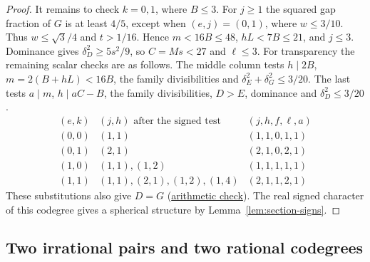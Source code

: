\documentclass[11pt,reqno]{amsart}
\newcommand{\codecheck}[2]{\href{https://github.com/sebastienpalcoux/grothendieck-ring-classification/blob/d5750105bb5758f3ad38d2e5464dfcc12c019816/supplements/rank6/sphericality/#1}{#2}}
\theoremstyle{remark}\newtheorem{remark}[theorem]{Remark}
\numberwithin{equation}{section}
\begin{document}
\begin{proof}
It remains to check $k=0,1$, where $B\le3$.
For $j\ge1$ the squared gap fraction of $G$ is at least $4/5$,
except when $(e,j)=(0,1)$, where $w\le3/10$.
Thus $w\le\sqrt3/4$ and $t>1/16$. Hence $m<16B\le48$,
$hL<7B\le21$, and $j\le3$. Dominance gives
$\delta_D^2\ge5s^2/9$, so $C=Ms<27$ and $\ell\le3$.
For transparency the remaining scalar checks are as follows.
The middle column tests $h\mid2B$, $m=2(B+hL)<16B$,
the family divisibilities and $\delta_E^2+\delta_G^2\le3/20$.
The last tests $a\mid m$, $h\mid aC-B$, the family divisibilities,
$D>E$, dominance and $\delta_D^2\le3/20$.
\[
\begin{array}{c|l|c}
(e,k)&(j,h)\text{ after the signed test}&(j,h,f,\ell,a)\\\hline
(0,0)&(1,1)&(1,1,0,1,1)\\
(0,1)&(2,1)&(2,1,0,2,1)\\
(1,0)&(1,1),(1,2)&(1,1,1,1,1)\\
(1,1)&(1,1),(2,1),(1,2),(1,4)&(2,1,1,2,1)
\end{array}
\]
These substitutions also give $D=G$
(\codecheck{golden_orbit_check.py}{arithmetic check}).
The real signed character of this codegree gives a spherical
structure by Lemma~\ref{lem:section-signs}.
\end{proof}
\subsection{Two irrational pairs and two rational codegrees}
\end{document}

